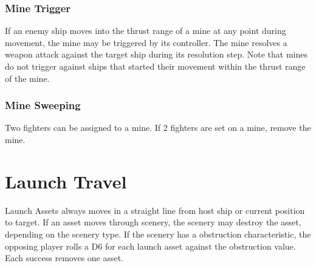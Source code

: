 \subsubsection{Mine Trigger}
If an enemy ship moves into the thrust range of a mine at any point during movement, the mine may be triggered by its controller. The mine resolves a weapon attack against the target ship during its resolution step. Note that mines do not trigger against ships that started their movement within the thrust range of the mine.

\subsubsection{Mine Sweeping}
Two fighters can be assigned to a mine. If 2 fighters are set on a mine, remove the mine.

\section{Launch Travel}
Launch Assets always moves in a straight line from host ship or current position to target. If an asset moves through scenery, the scenery may destroy the asset, depending on the scenery type. If the scenery has a obstruction characteristic, the opposing player rolls a D6 for each launch asset against the obstruction value. Each success removes one asset.